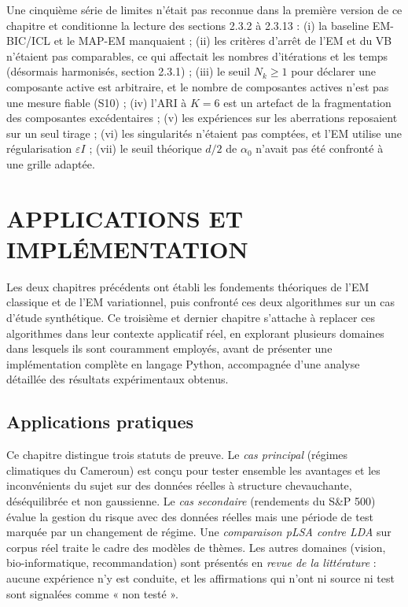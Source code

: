 Une cinquième série de limites n'était pas reconnue dans la première version de ce chapitre et conditionne la lecture des sections 2.3.2 à 2.3.13 : (i) la baseline EM-BIC/ICL et le MAP-EM manquaient ; (ii) les critères d'arrêt de l'EM et du VB n'étaient pas comparables, ce qui affectait les nombres d'itérations et les temps (désormais harmonisés, section 2.3.1) ; (iii) le seuil $N_k \geq 1$ pour déclarer une composante active est arbitraire, et le nombre de composantes actives n'est pas une mesure fiable (S10) ; (iv) l'ARI à $K = 6$ est un artefact de la fragmentation des composantes excédentaires ; (v) les expériences sur les aberrations reposaient sur un seul tirage ; (vi) les singularités n'étaient pas comptées, et l'EM utilise une régularisation $\varepsilon I$ ; (vii) le seuil théorique $d/2$ de $\alpha_0$ n'avait pas été confronté à une grille adaptée.


\chapter{APPLICATIONS ET IMPLÉMENTATION}
Les deux chapitres précédents ont établi les fondements théoriques de l'EM classique et de l'EM variationnel, puis confronté ces deux algorithmes sur un cas d'étude synthétique. Ce troisième et dernier chapitre s'attache à replacer ces algorithmes dans leur contexte applicatif réel, en explorant plusieurs domaines dans lesquels ils sont couramment employés, avant de présenter une implémentation complète en langage Python, accompagnée d'une analyse détaillée des résultats expérimentaux obtenus.

\section{Applications pratiques}
Ce chapitre distingue trois statuts de preuve. Le \emph{cas principal} (régimes climatiques du Cameroun) est conçu pour tester ensemble les avantages et les inconvénients du sujet sur des données réelles à structure chevauchante, déséquilibrée et non gaussienne. Le \emph{cas secondaire} (rendements du S\&P 500) évalue la gestion du risque avec des données réelles mais une période de test marquée par un changement de régime. Une \emph{comparaison pLSA contre LDA} sur corpus réel traite le cadre des modèles de thèmes. Les autres domaines (vision, bio-informatique, recommandation) sont présentés en \emph{revue de la littérature} : aucune expérience n'y est conduite, et les affirmations qui n'ont ni source ni test sont signalées comme « non testé ».

